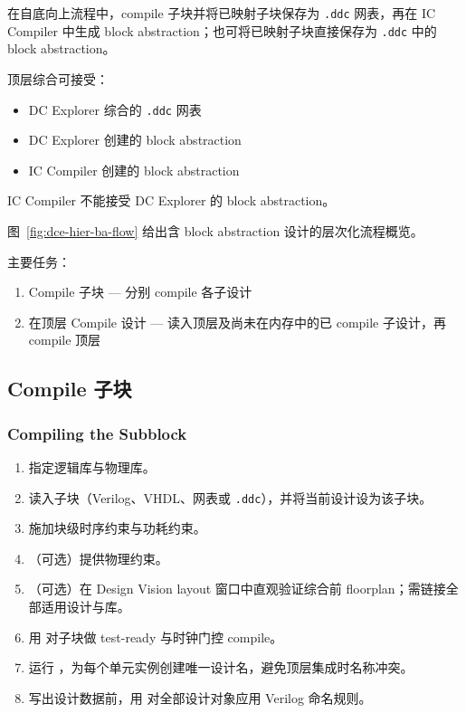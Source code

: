 在自底向上流程中，compile 子块并将已映射子块保存为 \texttt{.ddc} 网表，再在 IC Compiler 中生成 block abstraction；也可将已映射子块直接保存为 \texttt{.ddc} 中的 block abstraction。

顶层综合可接受：
\begin{itemize}
  \item DC Explorer 综合的 \texttt{.ddc} 网表
  \item DC Explorer 创建的 block abstraction
  \item IC Compiler 创建的 block abstraction
\end{itemize}

\begin{noteBox}
IC Compiler 不能接受 DC Explorer 的 block abstraction。
\end{noteBox}

图~\ref{fig:dce-hier-ba-flow} 给出含 block abstraction 设计的层次化流程概览。


主要任务：
\begin{enumerate}
  \item Compile 子块 — 分别 compile 各子设计
  \item 在顶层 Compile 设计 — 读入顶层及尚未在内存中的已 compile 子设计，再 compile 顶层
\end{enumerate}

\subsection{Compile 子块}
\subsubsection*{Compiling the Subblock}

\begin{enumerate}
  \item 指定逻辑库与物理库。
  \item 读入子块（Verilog、VHDL、网表或 \texttt{.ddc}），并将当前设计设为该子块。
  \item 施加块级时序约束与功耗约束。
  \item （可选）提供物理约束。
  \item （可选）在 Design Vision layout 窗口中直观验证综合前 floorplan；需链接全部适用设计与库。
  \item 用  对子块做 test-ready 与时钟门控 compile。
  \item 运行 ，为每个单元实例创建唯一设计名，避免顶层集成时名称冲突。
  \item 写出设计数据前，用  对全部设计对象应用 Verilog 命名规则。
\end{enumerate}

